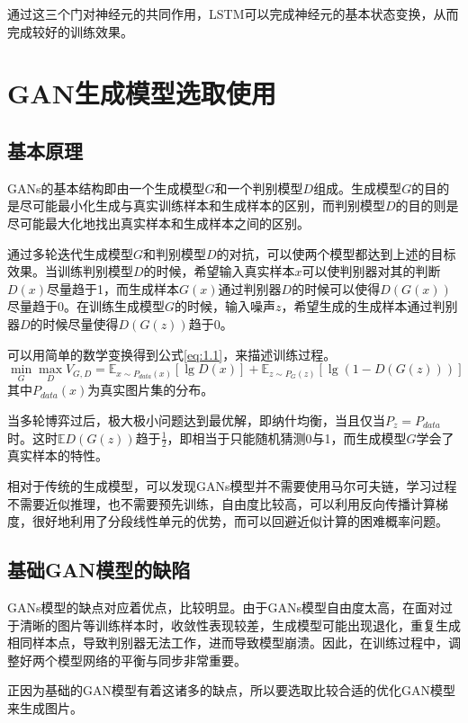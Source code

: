 通过这三个门对神经元的共同作用，LSTM可以完成神经元的基本状态变换，从而完成较好的训练效果。

\section{GAN生成模型选取使用}

\subsection{基本原理}
GANs的基本结构即由一个生成模型$G$和一个判别模型$D$组成。生成模型$G$的目的是尽可能最小化生成与真实训练样本和生成样本的区别，而判别模型$D$的目的则是尽可能最大化地找出真实样本和生成样本之间的区别。

通过多轮迭代生成模型$G$和判别模型$D$的对抗，可以使两个模型都达到上述的目标效果。当训练判别模型$D$的时候，希望输入真实样本$x$可以使判别器对其的判断$D(x)$尽量趋于1，而生成样本$G(x)$通过判别器$D$的时候可以使得$D(G(x))$尽量趋于0。在训练生成模型$G$的时候，输入噪声$z$，希望生成的生成样本通过判别器$D$的时候尽量使得$D(G(z))$趋于0。

可以用简单的数学变换得到公式\eqref{eq:1.1}，来描述训练过程。
\begin{equation}
    \label{eq:1.1}
    \min_{G}\max_{D} V_{G,D} = \mathbb{E}_{x \sim P_{data}(x)}[\lg D(x)] + \mathbb{E}_{z \sim P_{G}(z)}[\lg (1-D(G(z)))]
\end{equation}
其中$P_{data}(x)$为真实图片集的分布。

当多轮博弈过后，极大极小问题达到最优解，即纳什均衡，当且仅当$P_z = P_{data}$时。这时$\mathbb{E} D(G(z))$趋于$\frac{1}{2}$，即相当于只能随机猜测0与1，而生成模型$G$学会了真实样本的特性。

相对于传统的生成模型，可以发现GANs模型并不需要使用马尔可夫链，学习过程不需要近似推理，也不需要预先训练，自由度比较高，可以利用反向传播计算梯度，很好地利用了分段线性单元的优势，而可以回避近似计算的困难概率问题。
\subsection{基础GAN模型的缺陷}
GANs模型的缺点对应着优点，比较明显。由于GANs模型自由度太高，在面对过于清晰的图片等训练样本时，收敛性表现较差，生成模型可能出现退化，重复生成相同样本点，导致判别器无法工作，进而导致模型崩溃。因此，在训练过程中，调整好两个模型网络的平衡与同步非常重要。

正因为基础的GAN模型有着这诸多的缺点，所以要选取比较合适的优化GAN模型来生成图片。

